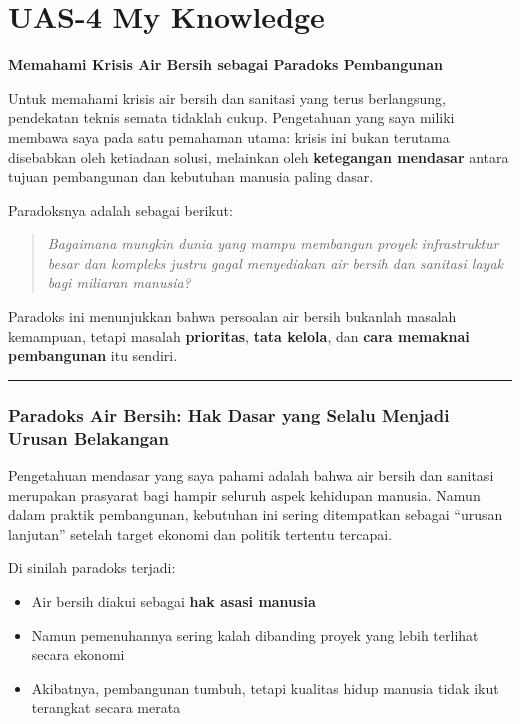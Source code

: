 \documentclass[
  letterpaper,
  DIV=11,
  numbers=noendperiod]{scrreprt}
\providecommand{\tightlist}{%
  \setlength{\itemsep}{0pt}\setlength{\parskip}{0pt}}
\begin{document}
\chapter{UAS-4 My Knowledge}\label{uas-4-my-knowledge}

\textbf{Memahami Krisis Air Bersih sebagai Paradoks Pembangunan}

Untuk memahami krisis air bersih dan sanitasi yang terus berlangsung,
pendekatan teknis semata tidaklah cukup. Pengetahuan yang saya miliki
membawa saya pada satu pemahaman utama: krisis ini bukan terutama
disebabkan oleh ketiadaan solusi, melainkan oleh \textbf{ketegangan
mendasar} antara tujuan pembangunan dan kebutuhan manusia paling dasar.

Paradoksnya adalah sebagai berikut:

\begin{quote}
\emph{Bagaimana mungkin dunia yang mampu membangun proyek infrastruktur
besar dan kompleks justru gagal menyediakan air bersih dan sanitasi
layak bagi miliaran manusia?}
\end{quote}

Paradoks ini menunjukkan bahwa persoalan air bersih bukanlah masalah
kemampuan, tetapi masalah \textbf{prioritas}, \textbf{tata kelola}, dan
\textbf{cara memaknai pembangunan} itu sendiri.

\begin{center}\rule{0.5\linewidth}{0.5pt}\end{center}

\subsection{Paradoks Air Bersih: Hak Dasar yang Selalu Menjadi Urusan
Belakangan}\label{paradoks-air-bersih-hak-dasar-yang-selalu-menjadi-urusan-belakangan}

Pengetahuan mendasar yang saya pahami adalah bahwa air bersih dan
sanitasi merupakan prasyarat bagi hampir seluruh aspek kehidupan
manusia. Namun dalam praktik pembangunan, kebutuhan ini sering
ditempatkan sebagai ``urusan lanjutan'' setelah target ekonomi dan
politik tertentu tercapai.

Di sinilah paradoks terjadi:

\begin{itemize}
\tightlist
\item
  Air bersih diakui sebagai \textbf{hak asasi manusia}
\item
  Namun pemenuhannya sering kalah dibanding proyek yang lebih terlihat
  secara ekonomi
\item
  Akibatnya, pembangunan tumbuh, tetapi kualitas hidup manusia tidak
  ikut terangkat secara merata
\end{itemize}
\end{document}
